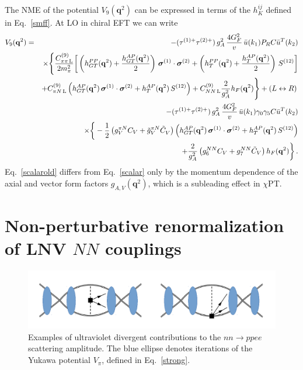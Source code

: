 \documentclass[letterpaper,11pt]{article}
\newcommand{\bea}{\begin{eqnarray}}
\newcommand{\eea}{\end{eqnarray}}
\newcommand{\boldsigma}{\mbox{\boldmath $\sigma$}}
\renewcommand{\vec}[1]{{\mathbf #1}}
\newcommand{\sq}{^{2}}
\newcommand{\nn}{\nonumber}
\begin{document}
The NME of the potential $V_9(\vec q^2)$ can be expressed in terms of the $h_{K}^{ij}$ defined in Eq.\ \eqref{smff}.
At LO in chiral EFT we can write 
\bea\label{scalarold}
V_{9}(\vec q^2) &=& -( \tau^{(1) +} \tau^{(2) + }) \, g_A\sq \,  \frac{4 G_F^2}{v} \,\bar u(k_1)P_R C\bar u^T(k_2) \nonumber \\
&&\times \Bigg\{\frac{  C^{(9)}_{\pi \pi\, \rm L}}{2m_\pi\sq}  \bigg[\left(h_{GT}^{PP}(\vec q\sq)+\frac{h_{GT}^{AP}(\vec q\sq)}{2}\right) \, \boldsigma^{(1)} \cdot \boldsigma^{(2)}+\left(h_{T}^{PP}(\vec q\sq)+\frac{h_{T}^{AP}(\vec q\sq)}{2}\right) \, S^{(12)}  \bigg]\nn\\
& & +     C_{\pi N\, \rm L}^{(9)} \left( h_{GT}^{AP}(\vec q\sq) \, \boldsigma^{(1)} \cdot \boldsigma^{(2)}+h_T^{AP}(\vec q\sq)\, S^{(12)}\right)+ C_{NN\, \rm L}^{(9)}\frac{2}{g_A^2} h_F(\vec q\sq) \Bigg\} + (L\leftrightarrow R)\, \nn \\
& & -( \tau^{(1) +} \tau^{(2) + }) \, g_A\sq \,  \frac{4 G_F^2}{v} \,\bar u(k_1)\gamma_0 \gamma_5 C\bar u^T(k_2) \nonumber \\
&&\times \bigg\{ - \frac{1}{2}\left( g_V^{\pi N}C_V+\tilde g_{V}^{\pi N}\tilde C_V^{}\right)\left( h_{GT}^{AP}(\vec q\sq) \, \boldsigma^{(1)} \cdot \boldsigma^{(2)}+h_T^{AP}(\vec q\sq)\, S^{(12)}\right)\nonumber \\
&& + \frac{2}{g_A^2}\left(g_6^{NN}C_{V}+g_7^{NN} \tilde{C}_{V}\right)  h_F(\vec q\sq) \bigg\}\,.
\eea
Eq.\ \eqref{scalarold} differs from Eq.~\eqref{scalar} only by the momentum dependence of the axial and vector form factors $g_{A,V}(\vec q^2)$, which is a subleading effect in $\chi$PT.  


\section{Non-perturbative renormalization of LNV $N\!N$ couplings}\label{NonWeinberg}

\begin{figure}
\includegraphics[width=\textwidth]{AmpDim9.pdf}
\caption{Examples of ultraviolet divergent contributions  to the $n n \rightarrow pp e e$ scattering amplitude.  The blue ellipse denotes iterations of the Yukawa potential $V_\pi$, defined in Eq.\ \eqref{strong}.
}\label{AmpDim9}
\end{figure}
\end{document}
